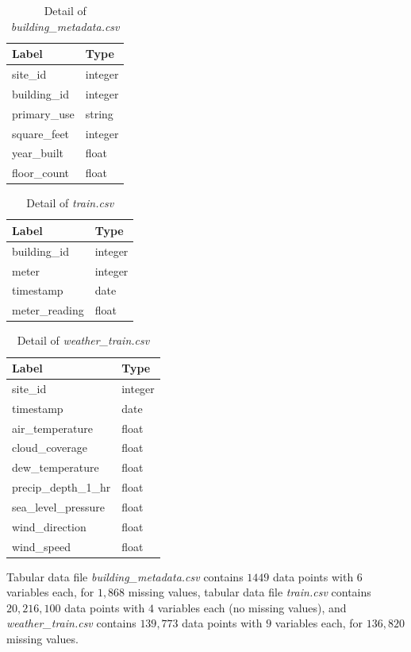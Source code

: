\documentclass[twocolumn, switch]{article}
\begin{document}
\begin{table}[H]
\caption{Detail of \textit{building\_metadata.csv}}
\centering
\begin{tabular}{ll}
\toprule
Label & Type \\
\midrule
site\_id & integer \\
building\_id & integer \\
primary\_use & string \\
square\_feet & integer \\
year\_built & float \\
floor\_count & float \\
\bottomrule
\end{tabular}
\label{tab:building}
\end{table}

\begin{table}[H]
\caption{Detail of \textit{train.csv}}
\centering
\begin{tabular}{ll}
\toprule
Label & Type \\
\midrule
building\_id & integer \\
meter & integer \\
timestamp & date \\
meter\_reading & float \\
\bottomrule
\end{tabular}
\label{tab:train}
\end{table}

\begin{table}[H]
\caption{Detail of \textit{weather\_train.csv}}
\centering
\begin{tabular}{ll}
\toprule
Label & Type \\
\midrule
site\_id & integer \\
timestamp & date \\
air\_temperature & float \\
cloud\_coverage & float \\
dew\_temperature & float \\
precip\_depth\_1\_hr & float \\
sea\_level\_pressure & float \\
wind\_direction & float \\
wind\_speed & float \\
\bottomrule
\end{tabular}
\label{tab:weather}
\end{table}

Tabular data file \textit{building\_metadata.csv} contains $1449$ data points with $6$ variables each, for $1,868$ missing values, tabular data file \textit{train.csv} contains $20,216,100$ data points with $4$ variables each (no missing values), and \textit{weather\_train.csv} contains $139,773$ data points with $9$ variables each, for $136,820$ missing values.
\end{document}
